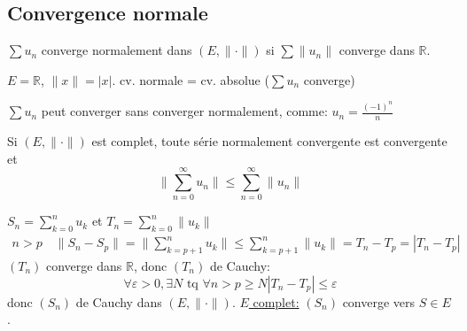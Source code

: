\documentclass[a4paper]{report}
\newcommand\R{\ensuremath{\mathbb{R}}}
\theoremstyle{definition}
\begin{document}
\subsection{Convergence normale}
\begin{definition}
   $\sum u_n$ converge normalement dans  $(E, \| \cdot \|)$ si  $\sum \|u_n\|$ converge dans  $\R$. 
\end{definition}
\begin{eg}
   $E = \R$, $\|x\| = |x|$. cv. normale = cv. absolue ($\sum u_n$ converge) 
\end{eg}
\begin{eg}
   $\sum u_n$ peut converger sans converger normalement, comme:  $u_n = \frac{(-1)^n}{n}$ 
\end{eg}

\begin{theorem}
    Si $(E, \| \cdot \|)$ est complet, toute série normalement convergente est convergente et 
     \[
    \|\sum_{n=0}^{\infty} u_n\| \le \sum_{n=0}^{\infty} \|u_n\|
    \] 
\end{theorem}
\begin{preuve}
   $S_n = \sum_{k=0}^{n} u_k$ et $T_n = \sum_{k=0}^{n} \|u_k\|$ 
   \begin{align*}
       n > p \quad \|S_n - S_p\| = \|\sum_{k = p+1}^{n} u_k\| \le \sum_{k=p+1}^{n} \|u_k\| = T_n - T_p = |T_n - T_p|
   \end{align*}
    $(T_n)$ converge dans  $\R$, donc $(T_n)$ de Cauchy:
     \[
    \forall \varepsilon > 0, \exists N \text{ tq } \forall n > p \ge N |T_n - T_p| \le \varepsilon
    \] 
    donc $(S_n)$ de Cauchy dans  $(E, \| \cdot \|)$.  \underline{$E$ complet:}  $(S_n)$ converge vers  $S \in E$.
\end{preuve}
\end{document}
